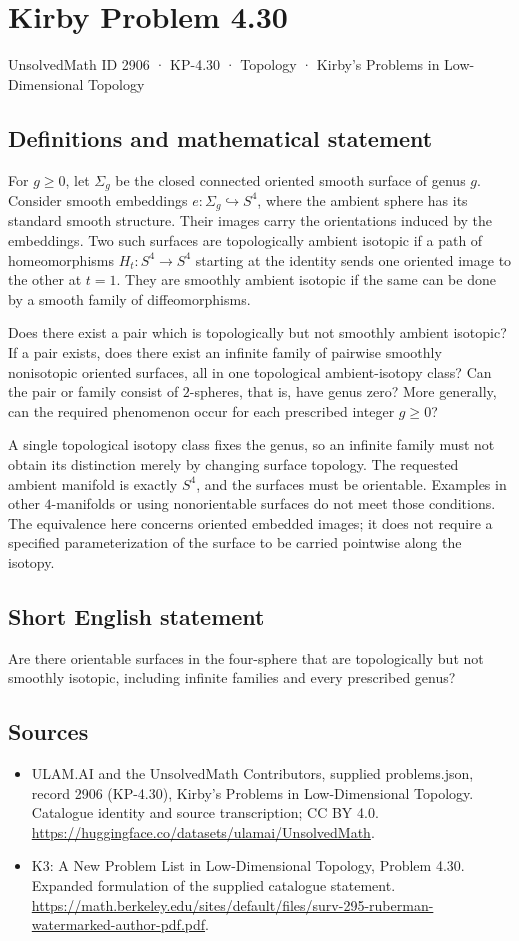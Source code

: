 \documentclass[11pt,a4paper]{article}
\begin{document}
\section*{Kirby Problem 4.30}\label{2906}
{\small UnsolvedMath ID 2906 · KP-4.30 · Topology · Kirby's Problems in Low-Dimensional Topology}
\subsection{Definitions and mathematical statement}
For $g\ge0$, let $\Sigma_g$ be the closed connected oriented smooth
surface of genus $g$. Consider smooth embeddings $e:\Sigma_g\hookrightarrow
S^4$, where the ambient sphere has its standard smooth structure.
Their images carry the orientations induced by the embeddings.
Two such surfaces are topologically ambient isotopic if a path of
homeomorphisms $H_t:S^4\to S^4$ starting at the identity sends one
oriented image to the other at $t=1$. They are smoothly ambient
isotopic if the same can be done by a smooth family of diffeomorphisms.

Does there exist a pair which is topologically but not smoothly
ambient isotopic? If a pair exists, does there exist an infinite
family of pairwise smoothly nonisotopic oriented surfaces, all in one
topological ambient-isotopy class? Can the pair or family consist of
$2$-spheres, that is, have genus zero? More generally, can the required
phenomenon occur for each prescribed integer $g\ge0$?

A single topological isotopy class fixes the genus, so an infinite
family must not obtain its distinction merely by changing surface
topology. The requested ambient manifold is exactly $S^4$, and the
surfaces must be orientable. Examples in other $4$-manifolds or using
nonorientable surfaces do not meet those conditions.
The equivalence here concerns oriented embedded images; it does not
require a specified parameterization of the surface to be carried
pointwise along the isotopy.
\subsection{Short English statement}
Are there orientable surfaces in the four-sphere that are topologically but not smoothly isotopic, including infinite families and every prescribed genus?
\subsection{Sources}
\begin{itemize}
\item[S1] ULAM.AI and the UnsolvedMath Contributors, supplied problems.json, record 2906 (KP-4.30), Kirby's Problems in Low-Dimensional Topology. Catalogue identity and source transcription; CC BY 4.0.
\url{https://huggingface.co/datasets/ulamai/UnsolvedMath}.
\item[S2] K3: A New Problem List in Low-Dimensional Topology, Problem 4.30. Expanded formulation of the supplied catalogue statement.
\url{https://math.berkeley.edu/sites/default/files/surv-295-ruberman-watermarked-author-pdf.pdf}.
\end{itemize}
\end{document}
